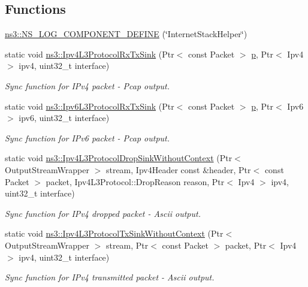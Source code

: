 \subsection*{Functions}
\begin{DoxyCompactItemize}
\item 
\hyperlink{namespacens3_a789b24c4e363754b6d9cbc54913fd7d4}{ns3\+::\+N\+S\+\_\+\+L\+O\+G\+\_\+\+C\+O\+M\+P\+O\+N\+E\+N\+T\+\_\+\+D\+E\+F\+I\+NE} (\char`\"{}Internet\+Stack\+Helper\char`\"{})
\item 
static void \hyperlink{namespacens3_a6531bb0b805a5b9a1ef7f4f1c4fb8002}{ns3\+::\+Ipv4\+L3\+Protocol\+Rx\+Tx\+Sink} (Ptr$<$ const Packet $>$ \hyperlink{lte__link__budget__x2__handover__measures_8m_ac9de518908a968428863f829398a4e62}{p}, Ptr$<$ Ipv4 $>$ ipv4, uint32\+\_\+t interface)
\begin{DoxyCompactList}\small\item\em Sync function for I\+Pv4 packet -\/ Pcap output. \end{DoxyCompactList}\item 
static void \hyperlink{namespacens3_a3af463351b1701a7898a00fc29f2f016}{ns3\+::\+Ipv6\+L3\+Protocol\+Rx\+Tx\+Sink} (Ptr$<$ const Packet $>$ \hyperlink{lte__link__budget__x2__handover__measures_8m_ac9de518908a968428863f829398a4e62}{p}, Ptr$<$ Ipv6 $>$ ipv6, uint32\+\_\+t interface)
\begin{DoxyCompactList}\small\item\em Sync function for I\+Pv6 packet -\/ Pcap output. \end{DoxyCompactList}\item 
static void \hyperlink{namespacens3_aa6faccffe4e7ec3e0a1f5ea80ed7f81d}{ns3\+::\+Ipv4\+L3\+Protocol\+Drop\+Sink\+Without\+Context} (Ptr$<$ Output\+Stream\+Wrapper $>$ stream, Ipv4\+Header const \&header, Ptr$<$ const Packet $>$ packet, Ipv4\+L3\+Protocol\+::\+Drop\+Reason reason, Ptr$<$ Ipv4 $>$ ipv4, uint32\+\_\+t interface)
\begin{DoxyCompactList}\small\item\em Sync function for I\+Pv4 dropped packet -\/ Ascii output. \end{DoxyCompactList}\item 
static void \hyperlink{namespacens3_ae08dabf17f5254377bcce237263a3c4d}{ns3\+::\+Ipv4\+L3\+Protocol\+Tx\+Sink\+Without\+Context} (Ptr$<$ Output\+Stream\+Wrapper $>$ stream, Ptr$<$ const Packet $>$ packet, Ptr$<$ Ipv4 $>$ ipv4, uint32\+\_\+t interface)
\begin{DoxyCompactList}\small\item\em Sync function for I\+Pv4 transmitted packet -\/ Ascii output. \end{DoxyCompactList}\item 

\end{DoxyCompactItemize}
